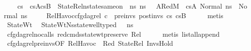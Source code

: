 \begin{isabellebody}
\ \ \ \ {\isachardoublequoteopen}cs{}\ {\isacharequal}{\kern0pt}\ cs{}A{\isacharat}{\kern0pt}cs{}B{\isachardoublequoteclose}\ \ StateRel{}{\isacharcolon}{\kern0pt}{\isachardoublequoteopen}nstate{\isacharunderscore}{\kern0pt}same{\isacharunderscore}{\kern0pt}on\ {\isasymLambda}\ ns{}\ ns{}{\isacharprime}{\kern0pt}\ {\isacharbraceleft}{\kern0pt}{\isacharbraceright}{\kern0pt}{\isachardoublequoteclose}\ \ A{}Red{}{\isacharcolon}{\kern0pt}{\isachardoublequoteopen}M{\isacharcomma}{\kern0pt}{\isasymLambda}{\isacharcomma}{\kern0pt}{\isasymGamma}{\isacharcomma}{\kern0pt}{\isasymOmega}\ {\isasymturnstile}\ {\isasymlangle}cs{}A{\isacharcomma}{\kern0pt}\ Normal\ ns{}{\isasymrangle}\ {\isacharbrackleft}{\kern0pt}{\isasymrightarrow}{\isacharbrackright}{\kern0pt}\ Normal\ ns{}{\isacharprime}{\kern0pt}{\isachardoublequoteclose}\isanewline
\ \ \ \ \ RelHavoc{\isacharcolon}{\kern0pt}{\isachardoublequoteopen}cfg{\isacharunderscore}{\kern0pt}dag{\isacharunderscore}{\kern0pt}rel\ c\ {\isacharbrackleft}{\kern0pt}{\isacharbrackright}{\kern0pt}\ pre{\isacharunderscore}{\kern0pt}invs\ post{\isacharunderscore}{\kern0pt}invs\ cs{}\ cs{}B{\isachardoublequoteclose}\isanewline
\ \ \ \ \isamarkupfalse%
\ metis\isanewline
\isanewline
\ \ \isamarkupfalse%
\ StateWt{}\ \isamarkupfalse%
\ StateWtNs{}{\isacharprime}{\kern0pt}{\isacharcolon}{\kern0pt}{\isachardoublequoteopen}state{\isacharunderscore}{\kern0pt}well{\isacharunderscore}{\kern0pt}typed\ {\isasymLambda}\ {\isasymOmega}\ ns{}{\isacharprime}{\kern0pt}{\isachardoublequoteclose}\ \isamarkupfalse%
\ cfg{\isacharunderscore}{\kern0pt}dag{\isacharunderscore}{\kern0pt}rel{\isacharunderscore}{\kern0pt}no{\isacharunderscore}{\kern0pt}calls{\isacharunderscore}{\kern0pt}{}\ red{\isacharunderscore}{\kern0pt}cmds{\isacharunderscore}{\kern0pt}state{\isacharunderscore}{\kern0pt}wt{\isacharunderscore}{\kern0pt}preserve\ Rel\isanewline
\ \ \ \ \isamarkupfalse%
\ {\isacharparenleft}{\kern0pt}metis\ list{\isacharunderscore}{\kern0pt}all{\isacharunderscore}{\kern0pt}append{\isacharparenright}{\kern0pt}\isanewline
\isanewline
\ \ \isamarkupfalse%
\ cfg{\isacharunderscore}{\kern0pt}dag{\isacharunderscore}{\kern0pt}rel{\isacharunderscore}{\kern0pt}pre{\isacharunderscore}{\kern0pt}invs{\isacharbrackleft}{\kern0pt}OF\ RelHavoc\ {\isacharunderscore}{\kern0pt}\ Red\ StateRel{}\ InvsHold{\isacharbrackright}{\kern0pt}\ \isamarkupfalse%

\end{isabellebody}
